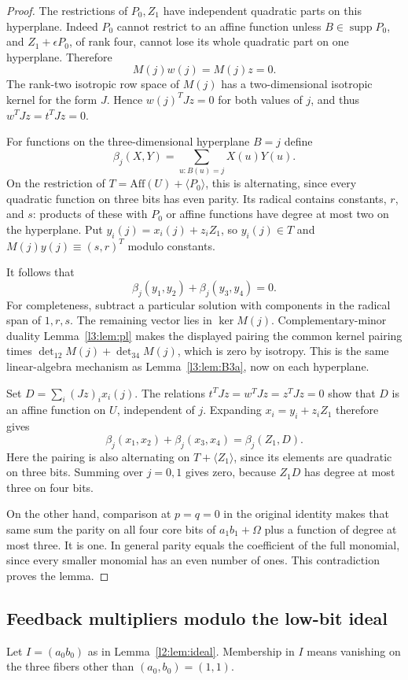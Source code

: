 \documentclass[11pt,a4paper]{article}
\theoremstyle{plain}
\theoremstyle{remark}
\newcommand{\Aff}{\mathrm{Aff}}
\newcommand{\supp}{\operatorname{supp}}
\begin{document}
\begin{proof}
The restrictions of $P_0,Z_1$ have independent quadratic parts on this hyperplane. Indeed $P_0$ cannot restrict to an affine function unless $B\in\supp P_0$, and $Z_1+\epsilon P_0$, of rank four, cannot lose its whole quadratic part on one hyperplane. Therefore
\[
M(j)w(j)=M(j)z=0.
\]
The rank-two isotropic row space of $M(j)$ has a two-dimensional isotropic kernel for the form $J$. Hence $w(j)^TJz=0$ for both values of $j$, and thus $w^TJz=t^TJz=0$.

For functions on the three-dimensional hyperplane $B=j$ define
\[
\beta_j(X,Y)=\sum_{u:B(u)=j}X(u)Y(u).
\]
On the restriction of $T=\Aff(U)+\langle P_0\rangle$, this is alternating, since every quadratic function on three bits has even parity. Its radical contains constants, $r$, and $s$: products of these with $P_0$ or affine functions have degree at most two on the hyperplane. Put $y_i(j)=x_i(j)+z_iZ_1$, so $y_i(j)\in T$ and $M(j)y(j)\equiv(s,r)^T$ modulo constants.

It follows that
\[
\beta_j(y_1,y_2)+\beta_j(y_3,y_4)=0.
\]
For completeness, subtract a particular solution with components in the radical span of $1,r,s$. The remaining vector lies in $\ker M(j)$. Complementary-minor duality Lemma~\ref{l3:lem:pl} makes the displayed pairing the common kernel pairing times $\det_{12}M(j)+\det_{34}M(j)$, which is zero by isotropy. This is the same linear-algebra mechanism as Lemma~\ref{l3:lem:B3a}, now on each hyperplane.

Set $D=\sum_i(Jz)_i x_i(j)$. The relations $t^TJz=w^TJz=z^TJz=0$ show that $D$ is an affine function on $U$, independent of $j$. Expanding $x_i=y_i+z_iZ_1$ therefore gives
\[
\beta_j(x_1,x_2)+\beta_j(x_3,x_4)=\beta_j(Z_1,D).
\]
Here the pairing is also alternating on $T+\langle Z_1\rangle$, since its elements are quadratic on three bits. Summing over $j=0,1$ gives zero, because $Z_1D$ has degree at most three on four bits.

On the other hand, comparison at $p=q=0$ in the original identity makes that same sum the parity on all four core bits of $a_1b_1+\Omega$ plus a function of degree at most three. It is one. In general parity equals the coefficient of the full monomial, since every smaller monomial has an even number of ones. This contradiction proves the lemma.
\end{proof}

\subsection{Feedback multipliers modulo the low-bit ideal}
Let $I=(a_0b_0)$ as in Lemma~\ref{l2:lem:ideal}. Membership in $I$ means vanishing on the three fibers other than $(a_0,b_0)=(1,1)$.
\end{document}
